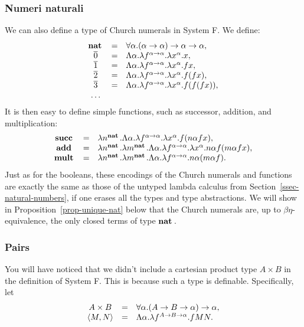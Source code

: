 \documentclass{article}
\begin{document}
\subsubsection{Numeri naturali}

We can also define a type of Church numerals in System F. We define:
\[ \begin{array}{ccl}
  \mathop{\textbf{\bf nat}\,} &=& \forall\alpha.(\alpha\to\alpha)\to\alpha\to\alpha,\\
  \mathop{\overline{0}} &=& \Lambda\alpha.\lambda f^{\alpha\to\alpha}.\lambda x^{\alpha}.x,\\
  \mathop{\overline{1}} &=& \Lambda\alpha.\lambda f^{\alpha\to\alpha}.\lambda x^{\alpha}.fx,\\
  \mathop{\overline{2}} &=& \Lambda\alpha.\lambda f^{\alpha\to\alpha}.\lambda x^{\alpha}.f(fx),\\
  \mathop{\overline{3}} &=&
  \Lambda\alpha.\lambda f^{\alpha\to\alpha}.\lambda x^{\alpha}.f(f(fx)),\\
  \ldots
\end{array}
\]
It is then easy to define simple functions, such as successor,
addition, and multiplication:
\[ \begin{array}{ccl}
  \mathop{\textbf{\bf succ}\,} &=& \lambda n^{\mathop{\textbf{\bf nat}\,}}.\Lambda\alpha.\lambda f^{\alpha\to\alpha}.\lambda x^{\alpha}.f(n\alpha f x),\\
  \mathop{\textbf{\bf add}\,} &=&  \lambda n^{\mathop{\textbf{\bf nat}\,}}.\lambda m^{\mathop{\textbf{\bf nat}\,}}.\Lambda\alpha.\lambda f^{\alpha\to\alpha}.\lambda x^{\alpha}.n\alpha f(m\alpha fx), \\
  \mathop{\textbf{\bf mult}\,} &=& \lambda n^{\mathop{\textbf{\bf nat}\,}}.\lambda m^{\mathop{\textbf{\bf nat}\,}}.\Lambda\alpha.\lambda f^{\alpha\to\alpha}.n\alpha (m\alpha f).
\end{array}
\]
Just as for the booleans, these encodings of the Church numerals and
functions are exactly the same as those of the untyped lambda calculus
from Section~\ref{ssec-natural-numbers}, if one erases all the types
and type abstractions.  We will show in
Proposition~\ref{prop-unique-nat} below that the Church numerals are,
up to $\beta\eta$-equivalence, the only closed terms of type $\mathop{\textbf{\bf nat}\,}$.

\subsubsection{Pairs}\label{ssec-pairs}

You will have noticed that we didn't include a cartesian product type
$A\times B$ in the definition of System F. This is because such a type
is definable. Specifically, let
\[ \begin{array}{ccl}
  A\times B &=& \forall\alpha.(A\to B\to\alpha)\to\alpha,\\
  \langle M,N\rangle &=& \Lambda\alpha.\lambda f^{A\to B\to\alpha}.fMN.
\end{array}
\]
\end{document}
